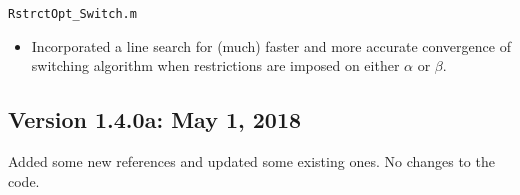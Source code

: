 \documentclass[10pt]{article}
\begin{document}
\noindent \verb|RstrctOpt_Switch.m|
\begin{itemize}
\item Incorporated a line search for (much) faster and more accurate convergence of switching algorithm when restrictions are imposed on either $\alpha$ or $\beta$.
\end{itemize}


\subsection{Version 1.4.0a: May 1, 2018}

\noindent Added some new references and updated some existing ones. No changes to the code.


\cleardoublepage
{}
{}


\end{document}
